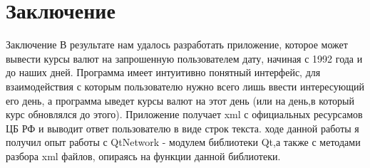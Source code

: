 \documentclass[aspectratio=169,xcolor=dvipsnames]{beamer}
\begin{document}
\section{Заключение}
\begin{frame}{Заключение}
В результате нам удалось разработать приложение, которое может вывести курсы валют на запрошенную пользователем дату, начиная с 1992 года и до наших дней. Программа имеет интуитивно понятный интерфейс, для взаимодействия с которым пользователю нужно всего лишь ввести интересующий его день, а программа ыведет курсы валют на этот день (или на день,в который курс обновлялся до этого). Приложение получает xml с официальных ресурсамов ЦБ РФ и выводит ответ пользователю в виде строк текста. \newline 
{} ходе данной работы я получил опыт работы с QtNetwork - модулем библиотеки Qt,а также с методами разбора xml файлов, опираясь на функции данной библиотеки.
\end{frame}

\end{document}
